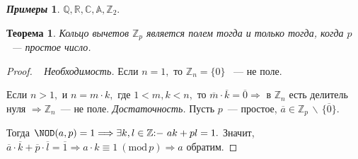 \documentclass[a4paper, 14pt]{extarticle}
\newcommand{\n}{\par}
\newcommand{\integers}{\mathbb{Z}}
\newcommand{\rationals}{\mathbb{Q}}
\newcommand{\real}{\mathbb{R}}
\newcommand{\complex}{\mathbb{C}}
\newcommand{\algebraic}{\mathbb{A}}
\newcommand{\suchthat}{{:}{-} \ }
\renewcommand{\mod}{\mathrm{mod} \,}
\theoremstyle{definition}
\newtheorem*{exmpls}{\textit{Примеры}}
\theoremstyle{plain}
\newtheorem*{theorem*}{Теорема}
\numberwithin{theorem}{section}
\numberwithin{definition}{section}
\numberwithin{statement}{section}
\numberwithin{lemma}{section}
\numberwithin{consequence}{section}
\begin{document}
		\begin{exmpls}
			$\rationals, \real, \complex, \algebraic, \integers_2.$
		\end{exmpls}
		\newpage
		\begin{theorem*}
			Кольцо вычетов  $\integers_p$ является полем тогда и только тогда, когда $p$~--- простое число.
		\end{theorem*}
		\begin{proof}
			\
			\newline
			{\textit{Необходимость.}} Если ${n = 1,}$ то ${\integers_n = \{0\}}$ ~--- не поле. \n
			Если ${n > 1,}$ и ${n = m \cdot k,}$  где ${1 < m, k < n,}$ то ${\overline{m} \cdot \overline{k} = \overline{0}} \Longrightarrow$ в $\integers_n$ есть делитель нуля ${\Longrightarrow \integers_n}$~--- не поле. \newline
			{\textit{Достаточность.}} Пусть $p$~--- простое, ${\overline{a} \in \integers_p \, \backslash \, \{\overline{0}\}.}$ \n
			Тогда ${{\NOD(a,p)} = 1} \Longrightarrow {\exists k,l \in \integers \suchthat ak + pl = 1.}$ Значит, ${\overline{a} \cdot \overline{k} + \overline{p} \cdot \overline{l} = \overline{1} \Longrightarrow a \cdot k \equiv 1 \ (\mod p) \Longrightarrow a}$ обратим.
		\end{proof}
	\newpage
\end{document}
